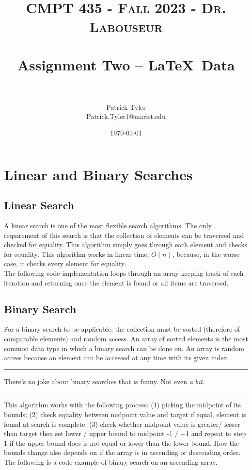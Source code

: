 \documentclass[letterpaper, 10pt]{article}
\title{	
   \normalfont \normalsize 
   \textsc{CMPT 435 - Fall 2023 - Dr. Labouseur} \\[10pt] %
   \horrule{0.5pt} \\[0.25cm] 	%
   \huge Assignment Two -- \LaTeX ~Data\\     	    %
   \horrule{0.5pt} \\[0.25cm] 	%
}
\author{Patrick Tyler \\ \normalsize Patrick.Tyler1@marist.edu}
\date{\normalsize\today} 	%
\begin{document}
\maketitle %


\section{Linear and Binary Searches}
\subsection{Linear Search}
A linear search is one of the most flexible search algorithms. The only requirement of this search is that
the collection of elements can be traversed and checked for equality. This algorithm simply goes through
each element and checks for equality. This algorithm works in linear time, $O(n)$, because, in the worse
case, it checks every element for equality. \\
\newline
\noindent
The following code implementation loops through an array keeping track of each iteration and returning
once the element is found or all items are traversed.


\subsection{Binary Search}
For a binary search to be applicable, the collection must be sorted (therefore of comparable elements)
and random access. An array of sorted elements is the most common data type in which a binary search
can be done on. An array is random access because an element can be accessed at any time with its
given index.\\
\vspace{.25cm}
\hrule
\vspace{.25cm}
\noindent
There's no joke about binary searches that is funny. Not even \textit{a bit.}\\
\hrule
\vspace{1cm}
\noindent
This algorithm works with the following process: (1) picking the midpoint of its bounds;
(2) check equality between midpoint value and target if equal, element is found at search is complete;
(3) check whether midpoint value is greater/ lesser than target then set lower / upper bound to
midpoint -1 / +1 and repeat to step 1 if the upper bound does is not equal or lower than the lower bound. 
How the bounds change also depends on if the array is in ascending or descending order.
The following is a code example of binary search on an ascending array.

\end{document}
